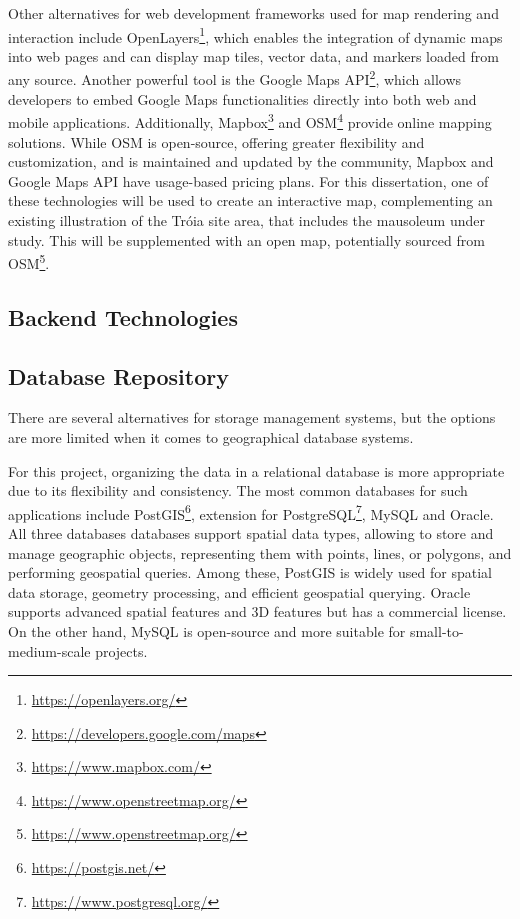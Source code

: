 Other alternatives for web development frameworks used for map rendering and interaction include OpenLayers\footnote{\url{https://openlayers.org/}}, which enables the integration of dynamic maps into web pages and can display map tiles, vector data, and markers loaded from any source.
Another powerful tool is the Google Maps API\footnote{\url{https://developers.google.com/maps}}, which allows developers to embed Google Maps functionalities directly into both web and mobile applications.
Additionally, Mapbox\footnote{\url{https://www.mapbox.com/}} and \gls{OSM}\footnote{\url{https://www.openstreetmap.org/}} provide online mapping solutions. While \gls{OSM} is open-source, offering greater flexibility and customization, and is maintained and updated by the community, Mapbox and Google Maps API have usage-based pricing plans.
For this dissertation, one of these technologies will be used to create an interactive map, complementing an existing illustration of the Tróia site area, that includes the mausoleum under study. This will be supplemented with an open map, potentially sourced from \gls{OSM}\footnote{\url{https://www.openstreetmap.org/}}.

\subsection{Backend Technologies}
\label{sec:backend} 


\subsection{Database Repository}
\label{sec:repos}

There are several alternatives for storage management systems, but the options are more limited when it comes to geographical
database systems.

For this project, organizing the data in a relational database is more appropriate due to its flexibility and consistency.
The most common databases for such applications include PostGIS\footnote{\url{https://postgis.net/}}, extension for PostgreSQL\footnote{\url{https://www.postgresql.org/}}, MySQL and Oracle.
All three databases databases support spatial data types, allowing to store and manage geographic objects, representing them with points, lines, or polygons, and performing geospatial queries.
Among these, PostGIS is widely used for spatial data storage, geometry processing, and efficient geospatial querying.
Oracle supports advanced spatial features and 3D features but has a commercial license. On the other hand, MySQL is open-source and more suitable for small-to-medium-scale projects.

